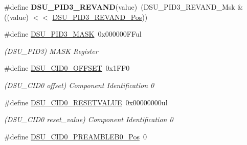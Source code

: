 \begin{DoxyCompactItemize}
\item 
\hypertarget{group___s_a_m_l21___d_s_u_gaf2028d73f3440267982dc85909f7eecc}{}\#define {\bfseries D\+S\+U\+\_\+\+P\+I\+D3\+\_\+\+R\+E\+V\+A\+N\+D}(value)~(D\+S\+U\+\_\+\+P\+I\+D3\+\_\+\+R\+E\+V\+A\+N\+D\+\_\+\+Msk \& ((value) $<$$<$ \hyperlink{group___s_a_m_l21___d_s_u_ga10e1892be1ad4ad3d2eb63267999efb9}{D\+S\+U\+\_\+\+P\+I\+D3\+\_\+\+R\+E\+V\+A\+N\+D\+\_\+\+Pos}))\label{group___s_a_m_l21___d_s_u_gaf2028d73f3440267982dc85909f7eecc}

\item 
\hypertarget{group___s_a_m_l21___d_s_u_gaeaed416954ecb7d99c60af8c7b68b8bb}{}\#define \hyperlink{group___s_a_m_l21___d_s_u_gaeaed416954ecb7d99c60af8c7b68b8bb}{D\+S\+U\+\_\+\+P\+I\+D3\+\_\+\+M\+A\+S\+K}~0x000000\+F\+Ful\label{group___s_a_m_l21___d_s_u_gaeaed416954ecb7d99c60af8c7b68b8bb}

\begin{DoxyCompactList}\small\item\em (D\+S\+U\+\_\+\+P\+I\+D3) M\+A\+S\+K Register \end{DoxyCompactList}\item 
\hypertarget{group___s_a_m_l21___d_s_u_ga04d4b050a6adad9da4caf0993e010d8f}{}\#define \hyperlink{group___s_a_m_l21___d_s_u_ga04d4b050a6adad9da4caf0993e010d8f}{D\+S\+U\+\_\+\+C\+I\+D0\+\_\+\+O\+F\+F\+S\+E\+T}~0x1\+F\+F0\label{group___s_a_m_l21___d_s_u_ga04d4b050a6adad9da4caf0993e010d8f}

\begin{DoxyCompactList}\small\item\em (D\+S\+U\+\_\+\+C\+I\+D0 offset) Component Identification 0 \end{DoxyCompactList}\item 
\hypertarget{group___s_a_m_l21___d_s_u_ga614c4aa7339cc2b804cd773e20ca7bf5}{}\#define \hyperlink{group___s_a_m_l21___d_s_u_ga614c4aa7339cc2b804cd773e20ca7bf5}{D\+S\+U\+\_\+\+C\+I\+D0\+\_\+\+R\+E\+S\+E\+T\+V\+A\+L\+U\+E}~0x00000000ul\label{group___s_a_m_l21___d_s_u_ga614c4aa7339cc2b804cd773e20ca7bf5}

\begin{DoxyCompactList}\small\item\em (D\+S\+U\+\_\+\+C\+I\+D0 reset\+\_\+value) Component Identification 0 \end{DoxyCompactList}\item 
\hypertarget{group___s_a_m_l21___d_s_u_ga684c02c36c7acb7066c55e248c85c44e}{}\#define \hyperlink{group___s_a_m_l21___d_s_u_ga684c02c36c7acb7066c55e248c85c44e}{D\+S\+U\+\_\+\+C\+I\+D0\+\_\+\+P\+R\+E\+A\+M\+B\+L\+E\+B0\+\_\+\+Pos}~0\label{group___s_a_m_l21___d_s_u_ga684c02c36c7acb7066c55e248c85c44e}


\end{DoxyCompactItemize}
